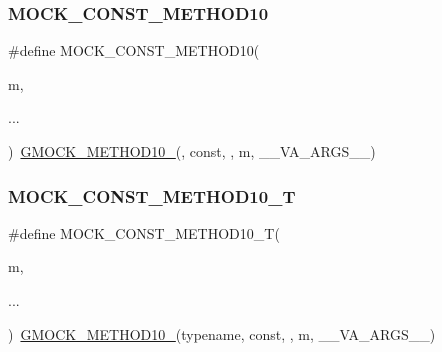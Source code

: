 \mbox{\label{_obj__test_2lib_2googletest-master_2googlemock_2include_2gmock_2gmock-generated-function-mockers_8h_a4f16ede0ef660fb6dc49e5f5d226fbf9}} 
\subsubsection{\texorpdfstring{MOCK\_CONST\_METHOD10}{MOCK\_CONST\_METHOD10}}
{\footnotesize\ttfamily \#define M\+O\+C\+K\+\_\+\+C\+O\+N\+S\+T\+\_\+\+M\+E\+T\+H\+O\+D10(\begin{DoxyParamCaption}\item[{}]{m,  }\item[{}]{... }\end{DoxyParamCaption})~\mbox{\hyperlink{_obj__test_2lib_2googletest-release-1_88_81_2googlemock_2include_2gmock_2gmock-generated-function-mockers_8h_a81a48223a8771de36ef92ac6d56f6e81}{G\+M\+O\+C\+K\+\_\+\+M\+E\+T\+H\+O\+D10\+\_\+}}(, const, , m, \+\_\+\+\_\+\+V\+A\+\_\+\+A\+R\+G\+S\+\_\+\+\_\+)}

\mbox{\label{_obj__test_2lib_2googletest-master_2googlemock_2include_2gmock_2gmock-generated-function-mockers_8h_aa31d758cb898bad2d16ac706c204da7f}} 
\subsubsection{\texorpdfstring{MOCK\_CONST\_METHOD10\_T}{MOCK\_CONST\_METHOD10\_T}}
{\footnotesize\ttfamily \#define M\+O\+C\+K\+\_\+\+C\+O\+N\+S\+T\+\_\+\+M\+E\+T\+H\+O\+D10\+\_\+T(\begin{DoxyParamCaption}\item[{}]{m,  }\item[{}]{... }\end{DoxyParamCaption})~\mbox{\hyperlink{_obj__test_2lib_2googletest-release-1_88_81_2googlemock_2include_2gmock_2gmock-generated-function-mockers_8h_a81a48223a8771de36ef92ac6d56f6e81}{G\+M\+O\+C\+K\+\_\+\+M\+E\+T\+H\+O\+D10\+\_\+}}(typename, const, , m, \+\_\+\+\_\+\+V\+A\+\_\+\+A\+R\+G\+S\+\_\+\+\_\+)}

